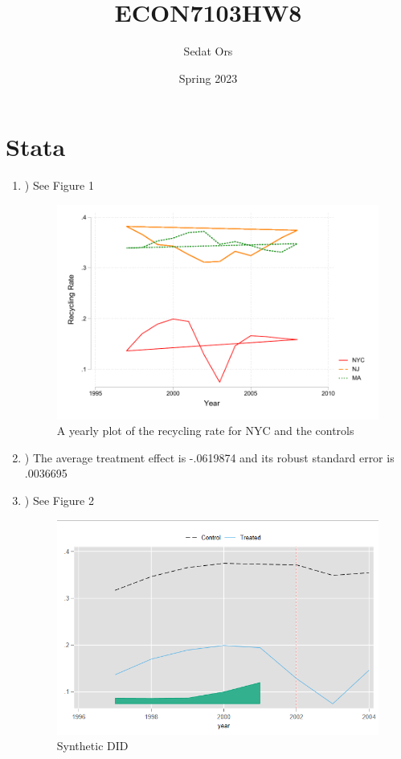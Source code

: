 \documentclass{article}
\title{ECON7103HW8}
\author{Sedat Ors}
\date{Spring 2023}
\begin{document}
\maketitle

\section{Stata}

\vspace{0.5cm}

\begin{enumerate}

\item ) See Figure 1
\begin{figure}[]
    \centering
     \includegraphics{HW8Q1.pdf}
    \caption{A yearly plot of the recycling rate for NYC and the controls}
    \label{tab:question3}
\end{figure}

\item ) The average treatment effect is -.0619874 and its robust standard error is .0036695 

\item ) See Figure  2

\begin{figure}[htbp]
    \centering
    \includegraphics[width=\textwidth]{HW8Q3.png}
    \caption{Synthetic DID}
    \label{fig:your_image_label}
\end{figure}


\end{enumerate}
\end{document}
